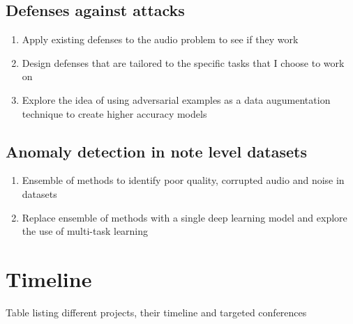 \documentclass[journal,onecolumn]{IEEEtran}
\begin{document}
\subsection{Defenses against attacks}
\begin{enumerate}
\item  Apply existing defenses to the audio problem to see if they work
\item Design defenses that are tailored to the specific tasks that I choose to work on
\item Explore the idea of using adversarial examples as a data augumentation technique to create higher accuracy models
\end{enumerate}

\subsection{Anomaly detection in note level datasets}
\begin{enumerate}
\item Ensemble of methods to identify poor quality, corrupted audio and noise in datasets
\item Replace ensemble of methods with a single deep learning model and explore the use of multi-task learning
\end{enumerate}
\section{Timeline}

Table listing different projects, their timeline and targeted conferences 




%
%
\end{document}
